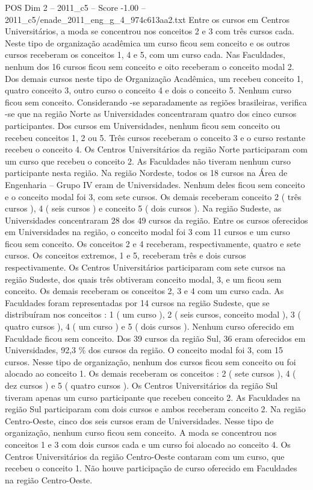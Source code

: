 \begin{textsample}{POS Dim 2 – 2011\_c5 – Score -1.00 – 2011\_c5/enade\_2011\_eng\_g\_4\_974c613aa2.txt}
Entre os cursos em Centros Universitários, a moda se concentrou nos conceitos 2 e 3 com três cursos cada.
Neste tipo de organização acadêmica um curso ficou sem conceito e os outros cursos receberam os conceitos 1, 4 e 5, com um curso cada.
Nas Faculdades, nenhum dos 16 cursos ficou sem conceito e oito receberam o conceito modal 2.
Dos demais cursos neste tipo de Organização Acadêmica, um recebeu conceito 1, quatro conceito 3, outro curso o conceito 4 e dois o conceito 5.
Nenhum curso ficou sem conceito.
Considerando -se separadamente as regiões brasileiras, verifica -se que na região Norte as Universidades concentraram quatro dos cinco cursos participantes.
Dos cursos em Universidades, nenhum ficou sem conceito ou recebeu conceitos 1, 2 ou 5.
Três cursos receberam o conceito 3 e o curso restante recebeu o conceito 4.
Os Centros Universitários da região Norte participaram com um curso que recebeu o conceito 2.
As Faculdades não tiveram nenhum curso participante nesta região.
Na região Nordeste, todos os 18 cursos na Área de Engenharia – Grupo IV eram de Universidades.
Nenhum deles ficou sem conceito e o conceito modal foi 3, com sete cursos.
Os demais receberam conceito 2 ( três cursos ), 4 ( seis cursos ) e conceito 5 ( dois cursos ).
Na região Sudeste, as Universidades concentraram 28 dos 49 cursos da região.
Entre os cursos oferecidos em Universidades na região, o conceito modal foi 3 com 11 cursos e um curso ficou sem conceito.
Os conceitos 2 e 4 receberam, respectivamente, quatro e sete cursos.
Os conceitos extremos, 1 e 5, receberam três e dois cursos respectivamente.
Os Centros Universitários participaram com sete cursos na região Sudeste, dos quais três obtiveram conceito modal, 3, e um ficou sem conceito.
Os demais receberam os conceitos 2, 3 e 4 com um curso cada.
As Faculdades foram representadas por 14 cursos na região Sudeste, que se distribuíram nos conceitos : 1 ( um curso ), 2 ( seis cursos, conceito modal ), 3 ( quatro cursos ), 4 ( um curso ) e 5 ( dois cursos ).
Nenhum curso oferecido em Faculdade ficou sem conceito.
Dos 39 cursos da região Sul, 36 eram oferecidos em Universidades, 92,3 \% dos cursos da região.
O conceito modal foi 3, com 15 cursos.
Nesse tipo de organização, nenhum dos cursos ficou sem conceito ou foi alocado ao conceito 1.
Os demais receberam os conceitos : 2 ( sete cursos ), 4 ( dez cursos ) e 5 ( quatro cursos ).
Os Centros Universitários da região Sul tiveram apenas um curso participante que recebeu conceito 2.
As Faculdades na região Sul participaram com dois cursos e ambos receberam conceito 2.
Na região Centro-Oeste, cinco dos seis cursos eram de Universidades.
Nesse tipo de organização, nenhum curso ficou sem conceito.
A moda se concentrou nos conceitos 1 e 3 com dois cursos cada e um curso foi alocado ao conceito 4.
Os Centros Universitários da região Centro-Oeste contaram com um curso, que recebeu o conceito 1.
Não houve participação de curso oferecido em Faculdades na região Centro-Oeste.

\end{textsample}
